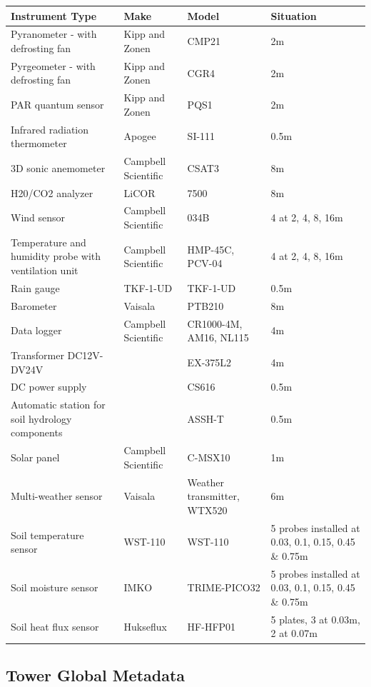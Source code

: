 \documentclass[11pt,a4paper]{article}
\begin{document}
\begin{longtable}{p{4.5cm}p{3.5cm}p{3.5cm}p{3.5cm}}
\toprule
\textbf{Instrument Type} & \textbf{Make} & \textbf{Model} & \textbf{Situation} \\
\midrule
\endhead
\bottomrule
\endfoot
Pyranometer  - with defrosting fan & Kipp and Zonen & CMP21 & 2m \\
Pyrgeometer   - with defrosting fan & Kipp and Zonen & CGR4 & 2m \\
PAR quantum sensor & Kipp and Zonen & PQS1 & 2m \\
Infrared radiation  thermometer & Apogee & SI-111 & 0.5m \\
3D sonic anemometer & Campbell Scientific & CSAT3 & 8m \\
H20/CO2 analyzer & LiCOR & 7500 & 8m \\
Wind sensor & Campbell Scientific & 034B & 4  at 2, 4, 8, 16m \\
Temperature and humidity  probe with ventilation unit & Campbell Scientific & HMP-45C,  PCV-04 & 4  at 2, 4, 8, 16m \\
Rain gauge & TKF-1-UD & TKF-1-UD & 0.5m \\
Barometer & Vaisala & PTB210 & 8m \\
Data logger & Campbell Scientific & CR1000-4M, AM16, NL115 & 4m \\
Transformer DC12V-DV24V &  & EX-375L2 & 4m \\
DC power supply &  & CS616 & 0.5m \\
Automatic station for soil  hydrology components &  & ASSH-T & 0.5m \\
Solar panel & Campbell Scientific & C-MSX10 & 1m \\
Multi-weather sensor & Vaisala & Weather transmitter, WTX520 & 6m \\
Soil temperature sensor & WST-110 & WST-110 & 5 probes  installed at 0.03, 0.1, 0.15, 0.45 \& 0.75m \\
Soil moisture sensor & IMKO & TRIME-PICO32 & 5 probes  installed at 0.03, 0.1, 0.15, 0.45 \& 0.75m \\
Soil heat flux sensor & Hukseflux & HF-HFP01 & 5  plates, 3 at 0.03m,                2 at 0.07m \\
\end{longtable}


\subsection*{Tower Global Metadata}
\end{document}
